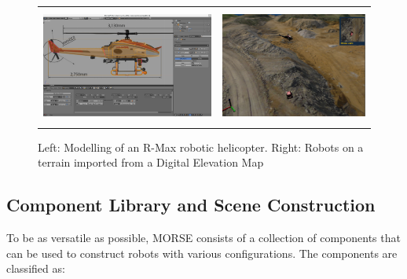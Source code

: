 \documentclass{llncs}
\begin{document}
\begin{figure}[ht!]
\centering
\begin{tabular}{cc}
 \includegraphics[height=1.5in]{pics/MORSE-rmax_mesh.png} &
 \includegraphics[height=1.5in]{pics/MORSE-quarry_ok-1.png}
\end{tabular}
\caption{Left: Modelling of an R-Max robotic helicopter. Right: Robots on a
    terrain imported from a Digital Elevation Map}
\label{fig:models}
\end{figure}



\subsection{Component Library and Scene Construction}
\label{section:components}

To be as versatile as possible, MORSE consists of a collection of components
that can be used to construct robots with various configurations. The
components are classified as:
\end{document}
